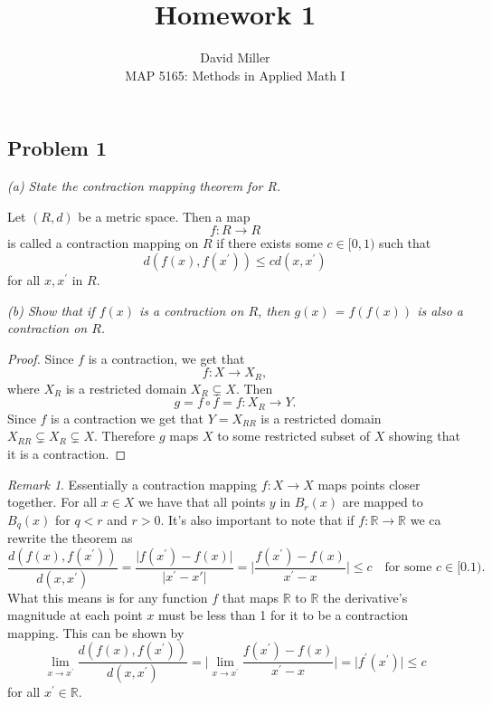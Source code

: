 \documentclass[12pt]{article}
\newenvironment{theorem}[2][]{\begin{trivlist}
 		\item[{\bfseries #1}\hskip \labelsep {\bfseries #2.}]}{\end{trivlist}}
\theoremstyle{remark}
\newtheorem*{remark}{Remark}
\begin{document}
 	
 	
 	\title{Homework 1}
 	\author{David Miller \\ 
 		MAP 5165: Methods in Applied Math I} 
 	
 	\maketitle
 	
 	\subsection*{Problem 1}
 	
 	\textit{(a) State the contraction mapping theorem for R.}
 	
 	\begin{theorem}{Contraction Mapping Theorem}
 		Let $(R,d)$ be a metric space. Then a map 
 		$$ f: R \rightarrow R $$
 		is called a contraction mapping on $R$ if there exists some $c \in [0,1)$ such that 
 		$$ d(f(x), f(x^\prime)) \leq cd(x, x^\prime) $$
 		for all $x, x^\prime$ in $R$.
 	\end{theorem}
 	
 	\vspace{1cm}
 	\noindent \textit{(b) Show that if $f(x)$ is a contraction on $R$, then $g(x)$ = $f(f(x))$ is also a contraction on $R$.}
 	
 	\begin{proof}
 		Since $f$ is a contraction, we get that 
 		$$ f:X \rightarrow X_R, $$
 		where $X_R$ is a restricted domain $X_R \subsetneq X$. Then 
 		$$ g = f \circ f = f:X_R \rightarrow Y. $$
 		Since $f$ is a contraction we get that $Y = X_{RR}$ is a restricted domain $X_{RR} \subsetneq X_R \subsetneq X$. Therefore $g$ maps $X$ to some restricted subset of $X$ showing that it is a contraction.
 	\end{proof}
 	\begin{remark}{1}
 		Essentially a contraction mapping $f: X \rightarrow X$ maps points closer together. For all $x \in X$ we have that all points $y$ in $B_r(x)$ are mapped to $B_q(x)$ for $q < r$ and $r > 0$. It's also important to note that if $f:\mathbb{R} \rightarrow \mathbb{R}$ we ca rewrite the theorem as 
 		$$ \frac{d(f(x), f(x^\prime))}{d(x, x^\prime)} = \frac{\vert f(x^\prime) - f(x) \vert}{\vert x^\prime - x \prime \vert} = \Big\vert \frac{f(x^\prime) - f(x)}{x^\prime - x} \Big\vert \leq c \quad \text{for some } c \in [0.1).$$
 		What this means is for any function $f$ that maps $\mathbb{R}$ to $\mathbb{R}$ the derivative's magnitude at each point $x$ must be less than 1 for it to be a contraction mapping. This can be shown by
 		$$ \lim\limits_{x \rightarrow x^\prime} \frac{d(f(x), f(x^\prime))}{d(x, x^\prime)} = \Big\vert \lim\limits_{x \rightarrow x^\prime} \frac{f(x^\prime) - f(x)}{x^\prime - x}  \Big\vert = \vert f^\prime(x^\prime) \vert \leq c $$
 		for all $x^\prime \in \mathbb{R}$.
 	\end{remark}
 	
\end{document}
